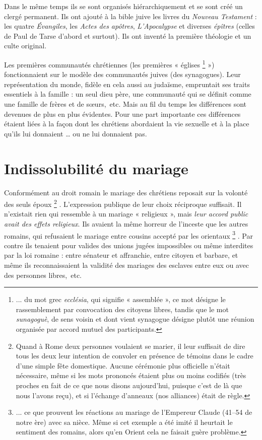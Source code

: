  Dans le même temps ils se sont organisés hiérarchiquement et se sont créé un clergé permanent. Ils ont ajouté à la bible juive les livres du \emph{Nouveau Testament} : les quatre \emph{Évangiles}, les \emph{Actes des apôtres}, \emph{L'Apocalypse} et diverses \emph{épîtres} (celles de Paul de Tarse d'abord et surtout). Ils ont inventé la première théologie et un culte original. 

 Les premières communautés chrétiennes (les premières « églises%
\footnote{... du mot grec \emph{ecclésia}, qui signifie « assemblée », ce mot désigne le rassemblement par convocation des citoyens libres, tandis que le mot \emph{sunagoguè}, de sens voisin et dont vient synagogue désigne plutôt une réunion organisée par accord mutuel des participants.}
») fonctionnaient sur le modèle des communautés juives (des synagogues). Leur représentation du monde, fidèle en cela aussi au judaïsme, empruntait ses traits essentiels à la famille : un seul dieu père, une communauté qui se définit comme une famille de frères et de sœurs,~etc. Mais au fil du temps les différences sont devenues de plus en plus évidentes. Pour une part importante ces différences étaient liées à la façon dont les chrétiens abordaient la vie sexuelle et à la place qu'ils lui donnaient … ou ne lui donnaient pas. 


\section{Indissolubilité du mariage}

 Conformément au droit romain le mariage des chrétiens reposait sur la volonté des seuls époux%
\footnote{Quand à Rome deux personnes voulaient se marier, il leur suffisait de dire tous les deux leur intention de convoler en présence de témoins dans le cadre d'une simple fête domestique. Aucune cérémonie plus officielle n'était nécessaire, même si les mots prononcés étaient plus ou moins codifiés (très proches en fait de ce que nous disons aujourd'hui, puisque c'est de là que nous l'avons reçu), et si l'échange d'anneaux (nos alliances) était de règle.}%
. L'expression publique de leur choix réciproque suffisait. Il n'existait rien qui ressemble à un mariage « religieux », mais \emph{leur accord public avait des effets religieux}. Ils avaient la même horreur de l'inceste que les autres romains, qui refusaient le mariage entre cousins accepté par les orientaux%
\footnote{... ce que prouvent les réactions au mariage de l'Empereur Claude (41--54 de notre ère) avec sa nièce. Même si cet exemple a été imité il heurtait le sentiment des romains, alors qu'en Orient cela ne faisait guère problème.}%
. Par contre ils tenaient pour valides des unions jugées impossibles ou même interdites par la loi romaine : entre sénateur et affranchie, entre citoyen et barbare, et même ils reconnaissaient la validité des mariages des esclaves entre eux ou avec des personnes libres,~etc.


